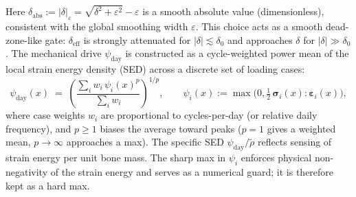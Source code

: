 Here $\delta_{\mathrm{abs}}:=|\delta|_\varepsilon=\sqrt{\delta^2+\varepsilon^2}-\varepsilon$ is a smooth absolute value (dimensionless), consistent with the global smoothing width $\varepsilon$.
This choice acts as a smooth dead-zone-like gate: $\delta_{\mathrm{eff}}$ is strongly attenuated for $|\delta|\lesssim \delta_0$ and approaches $\delta$ for $|\delta|\gg \delta_0$.
The mechanical drive $\psi_{\mathrm{day}}$ is constructed as a cycle-weighted power mean of the local strain energy density (SED) across a discrete set of loading cases:
\begin{equation}\label{eq:stim-psi-nd}
\psi_{\mathrm{day}}(x) \;=\;
\left(\frac{\sum_i w_i\,\psi_i(x)^p}{\sum_i w_i}\right)^{1/p},\qquad
\psi_i(x):=\max\!\Big(0,\tfrac12\,\boldsymbol{\sigma}_i(x):\boldsymbol{\varepsilon}_i(x)\Big),
\end{equation}
where case weights $w_i$ are proportional to cycles-per-day (or relative daily frequency), and $p\ge 1$ biases the average toward peaks ($p=1$ gives a weighted mean, $p\to\infty$ approaches a max). The specific SED $\psi_{\mathrm{day}}/\widetilde\rho$ reflects sensing of strain energy per unit bone mass. The sharp max in $\psi_i$ enforces physical non-negativity of the strain energy and serves as a numerical guard; it is therefore kept as a hard max.

